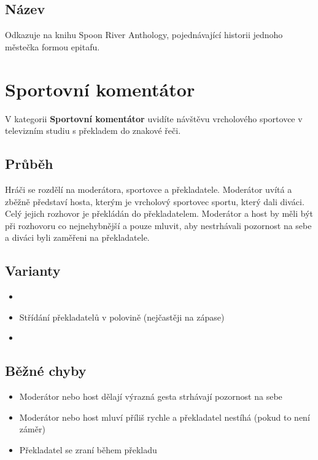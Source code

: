 \subsection{Název} Odkazuje na knihu Spoon River Anthology, pojednávající historii jednoho městečka formou epitafu. 
 
 
 
 
\needspace{5cm} \section{Sportovní komentátor} \label{sportovní komentátor}  
 
V kategorii \textbf{Sportovní komentátor}{} uvidíte návštěvu vrcholového sportovce v televizním studiu s překladem do znakové řeči. 
 
\subsection{ Průběh } Hráči se rozdělí na moderátora, sportovce a překladatele. Moderátor uvítá a zběžně představí hosta, kterým je vrcholový sportovec sportu, který dali diváci. Celý jejich rozhovor je překládán do  překladatelem. Moderátor a host by měli být při rozhovoru co nejnehybnější a pouze mluvit, aby nestrhávali pozornost na sebe a diváci byli zaměřeni na překladatele. 
 
\subsection{ Varianty } \begin{itemize}
\item  {}
\item  Střídání překladatelů v polovině (nejčastěji na zápase)
\item  {}
\end{itemize}
 
\subsection{ Běžné chyby } \begin{itemize}
\item  Moderátor nebo host dělají výrazná gesta strhávají pozornost na sebe
\item  Moderátor nebo host mluví příliš rychle a překladatel nestíhá (pokud to není záměr)
\item  Překladatel se zraní během překladu
\end{itemize}
 
